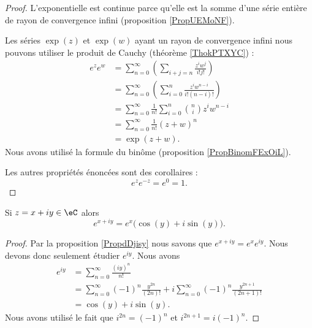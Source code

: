 \begin{proof}
    L'exponentielle est continue parce qu'elle est la somme d'une série entière de rayon de convergence infini (proposition \ref{PropUEMoNF}).

    Les séries \( \exp(z)\) et \( \exp(w)\) ayant un rayon de convergence infini nous pouvons utiliser le produit de Cauchy (théorème \ref{ThokPTXYC}) :
    \begin{subequations}
        \begin{align}
            e^{z} e^{w}&=\sum_{n=0}^{\infty}\left( \sum_{i+j=n}\frac{ z^iw^j }{ i!j! } \right)\\
            &=\sum_{n=0}^{\infty}\left( \sum_{i=0}^n\frac{ z^iw^{n-i} }{ i!(n-i)! } \right)\\
            &=\sum_{n=0}^{\infty}\frac{1}{ n! }\sum_{i=0}^{n}{n\choose i}z^iw^{n-i}\\
            &=\sum_{n=0}^{\infty}\frac{1}{ n! }(z+w)^{n}\\
            &=\exp(z+w).
        \end{align}
    \end{subequations}
    Nous avons utilisé la formule du binôme (proposition \ref{PropBinomFExOiL}).

    Les autres propriétés énoncées sont des corollaires :
    \begin{equation}
        e^{z} e^{-z}= e^{0}=1.
    \end{equation}
\end{proof}

\begin{proposition}
    Si \( z=x+iy\in \eC\) alors
    \begin{equation}
        e^{x+iy}= e^{x}\big( \cos(y)+i\sin(y) \big).
    \end{equation}
\end{proposition}

\begin{proof}
    Par la proposition \ref{PropdDjisy} nous savons que \(  e^{x+iy}= e^{x} e^{iy}\). Nous devons donc seulement étudier \(  e^{iy}\). Nous avons
    \begin{subequations}
        \begin{align}
            e^{iy}&=\sum_{n=0}^{\infty}\frac{ (iy)^n }{ n! }\\
            &=\sum_{n=0}^{\infty}(-1)^n\frac{ y^{2n} }{ (2n)! }+i\sum_{n=0}^{\infty}(-1)^n\frac{ y^{2n+1} }{ (2n+1)! }\\
            &=\cos(y)+i\sin(y).
        \end{align}
    \end{subequations}
    Nous avons utilisé le fait que \( i^{2n}=(-1)^n\) et \( i^{2n+1}=i(-1)^n\).
\end{proof}

